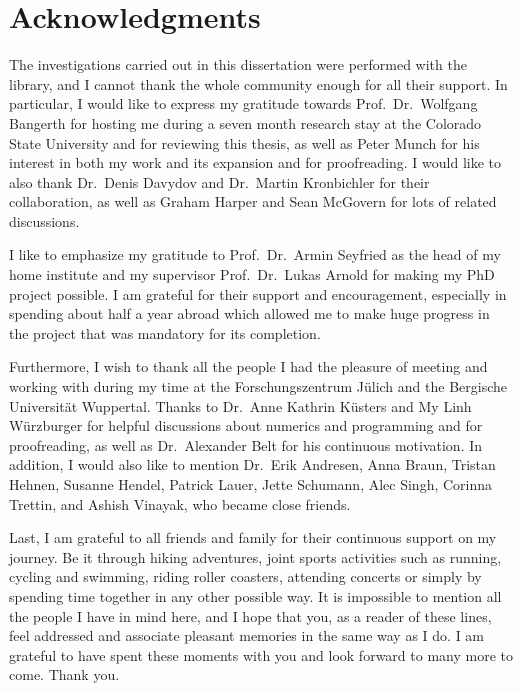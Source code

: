 \section*{\centering Acknowledgments}

The investigations carried out in this dissertation were performed with the \dealii{} library, and I cannot thank the whole \dealii{} community enough for all their support. In particular, I would like to express my gratitude towards Prof.\ Dr.\ Wolfgang Bangerth for hosting me during a seven month research stay at the Colorado State University and for reviewing this thesis, as well as Peter Munch for his interest in both my work and its expansion and for proofreading. I would like to also thank Dr.\ Denis Davydov and Dr.\ Martin Kronbichler for their collaboration, as well as Graham Harper and Sean McGovern for lots of \dealii{} related discussions.

I like to emphasize my gratitude to Prof.\ Dr.\ Armin Seyfried as the head of my home institute and my supervisor Prof.\ Dr.\ Lukas Arnold for making my PhD project possible. I am grateful for their support and encouragement, especially in spending about half a year abroad which allowed me to make huge progress in the project that was mandatory for its completion.

Furthermore, I wish to thank all the people I had the pleasure of meeting and working with during my time at the Forschungszentrum Jülich and the Bergische Universität Wuppertal. Thanks to Dr.\ Anne Kathrin Küsters and My Linh Würzburger for helpful discussions about numerics and programming and for proofreading, as well as Dr.\ Alexander Belt for his continuous motivation. In addition, I would also like to mention Dr.\ Erik Andresen, Anna Braun, Tristan Hehnen, Susanne Hendel, Patrick Lauer, Jette Schumann, Alec Singh, Corinna Trettin, and Ashish Vinayak, who became close friends.

Last, I am grateful to all friends and family for their continuous support on my journey. Be it through hiking adventures, joint sports activities such as running, cycling and swimming, riding roller coasters, attending concerts or simply by spending time together in any other possible way. It is impossible to mention all the people I have in mind here, and I hope that you, as a reader of these lines, feel addressed and associate pleasant memories in the same way as I do. I am grateful to have spent these moments with you and look forward to many more to come. Thank you.
